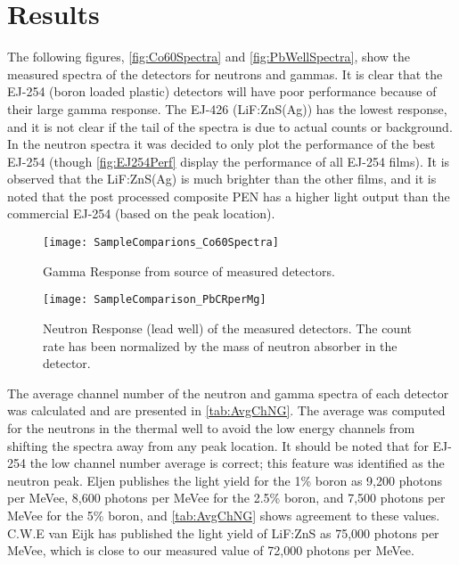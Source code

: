 \section{Results}
The following figures, \autoref{fig:Co60Spectra} and \autoref{fig:PbWellSpectra}, show the measured spectra of the detectors for neutrons and gammas.
It is clear that the EJ-254 (boron loaded plastic) detectors will have poor performance because of their large gamma response.
The EJ-426 (LiF:ZnS(Ag)) has the lowest response, and it is not clear if the tail of the spectra is due to actual counts or background.
In the neutron spectra it was decided to only plot the performance of the best EJ-254 (though \autoref{fig:EJ254Perf} display the performance of all EJ-254 films).
It is observed that the LiF:ZnS(Ag) is much brighter than the other films, and it is noted that the post processed composite PEN has a higher light output than the commercial EJ-254 (based on the peak location).
\begin{figure}
  \centering
  \texttt{[image: SampleComparions\_Co60Spectra]}
  \caption[Gamma Response of Measured Detectors]{Gamma Response from  source of measured detectors.}
  \label{fig:Co60Spectra}
\end{figure}
\begin{figure}
  \centering
  \texttt{[image: SampleComparison\_PbCRperMg]}
  \caption[Neutron Response of Measured Detectors]{Neutron Response (lead well) of the measured detectors. The count rate has been normalized by the mass of neutron absorber in the detector.}
  \label{fig:PbWellSpectra}
\end{figure}
The average channel number of the neutron and gamma spectra of each detector was calculated and are presented in \autoref{tab:AvgChNG}.
The average was computed for the neutrons in the thermal well to avoid the low energy channels from shifting the spectra away from any peak location.
It should be noted that for EJ-254 the low channel number average is correct; this feature was identified as the neutron peak.
Eljen publishes the light yield for the 1\% boron as 9,200 photons per MeVee, 8,600 photons per MeVee for the 2.5\% boron, and 7,500 photons per MeVee for the 5\% boron, and \autoref{tab:AvgChNG} shows agreement to these values.
C.W.E van Eijk has published the light yield of LiF:ZnS as 75,000 photons per MeVee, which is close to our measured value of 72,000 photons per MeVee.

